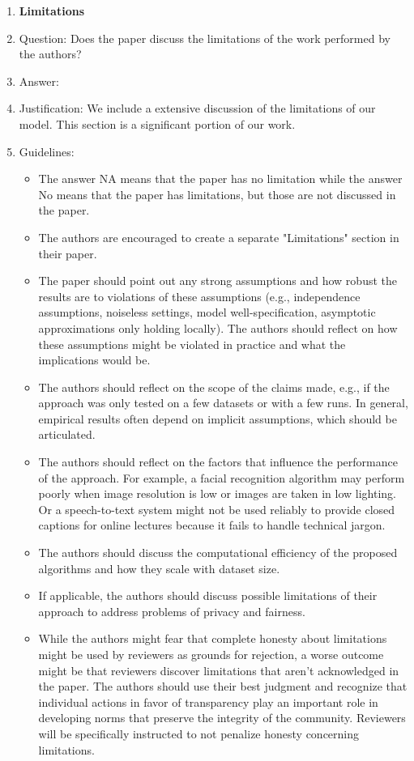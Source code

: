 \documentclass{article}
\begin{document}
\begin{enumerate}
\item {\bf Limitations}
    \item[] Question: Does the paper discuss the limitations of the work performed by the authors?
    \item[] Answer: \answerYes{} %
    \item[] Justification: We include a extensive discussion of the limitations of our model. This section is a significant portion of our work.
    \item[] Guidelines:
    \begin{itemize}
        \item The answer NA means that the paper has no limitation while the answer No means that the paper has limitations, but those are not discussed in the paper. 
        \item The authors are encouraged to create a separate "Limitations" section in their paper.
        \item The paper should point out any strong assumptions and how robust the results are to violations of these assumptions (e.g., independence assumptions, noiseless settings, model well-specification, asymptotic approximations only holding locally). The authors should reflect on how these assumptions might be violated in practice and what the implications would be.
        \item The authors should reflect on the scope of the claims made, e.g., if the approach was only tested on a few datasets or with a few runs. In general, empirical results often depend on implicit assumptions, which should be articulated.
        \item The authors should reflect on the factors that influence the performance of the approach. For example, a facial recognition algorithm may perform poorly when image resolution is low or images are taken in low lighting. Or a speech-to-text system might not be used reliably to provide closed captions for online lectures because it fails to handle technical jargon.
        \item The authors should discuss the computational efficiency of the proposed algorithms and how they scale with dataset size.
        \item If applicable, the authors should discuss possible limitations of their approach to address problems of privacy and fairness.
        \item While the authors might fear that complete honesty about limitations might be used by reviewers as grounds for rejection, a worse outcome might be that reviewers discover limitations that aren't acknowledged in the paper. The authors should use their best judgment and recognize that individual actions in favor of transparency play an important role in developing norms that preserve the integrity of the community. Reviewers will be specifically instructed to not penalize honesty concerning limitations.
    \end{itemize}


\end{enumerate}
\end{document}
